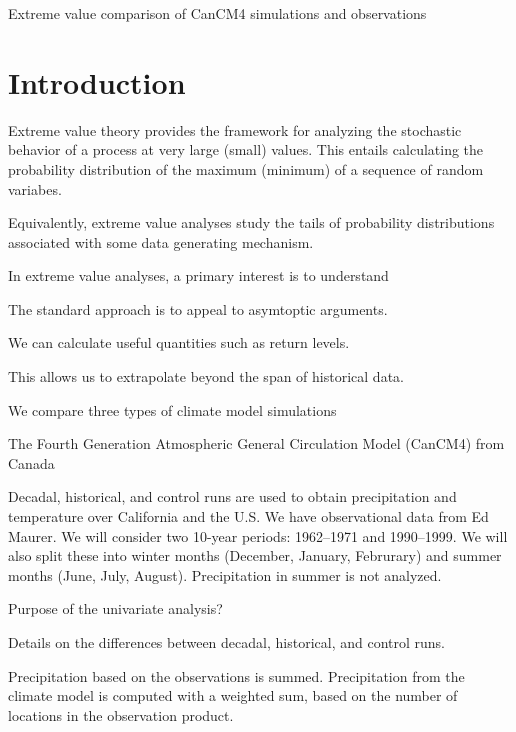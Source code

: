 \documentclass[12pt]{article}
\begin{document}
\begin{Large}
\noindent Extreme value comparison of CanCM4 simulations and observations
\end{Large}

\section{Introduction}
\label{intro}



Extreme value theory provides the framework for analyzing the stochastic behavior of a process at very large (small) values. This entails calculating the probability distribution of the maximum (minimum) of a sequence of random variabes. 

Equivalently, extreme value analyses study the tails of probability distributions associated with some data generating mechanism. 

In extreme value analyses, a primary interest is to understand 

The standard approach is to appeal to asymtoptic arguments.

We can calculate useful quantities such as return levels.

This allows us to extrapolate beyond the span of historical data.


We compare three types of climate model simulations 

The Fourth Generation Atmospheric General Circulation Model (CanCM4) from Canada 

Decadal, historical, and control runs are used to obtain precipitation and temperature over California and the U.S. We have observational data from Ed Maurer. We will consider two 10-year periods: 1962--1971 and 1990--1999. We will also split these into winter months (December, January, Februrary) and summer months (June, July, August). Precipitation in summer is not analyzed.
\bigskip

Purpose of the univariate analysis?
\bigskip

Details on the differences between decadal, historical, and control runs.
\bigskip

Precipitation based on the observations is summed. Precipitation from the climate model is computed with a weighted sum, based on the number of locations in the observation product.
\bigskip
\end{document}

